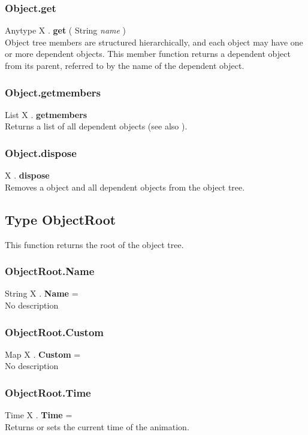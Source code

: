 \subsubsection{Object.get \label{F:Object:get}}
Anytype X . \textbf{get} ( String \textit{name} ) \\
Object tree members are structured hierarchically, and each object may have one or more dependent objects. This member function returns a dependent object from its parent, referred to by the name of the dependent object.

\subsubsection{Object.getmembers \label{F:Object:getmembers}}
List X . \textbf{getmembers} \\
Returns a list of all dependent objects (see also ).

\subsubsection{Object.dispose \label{F:Object:dispose}}
X . \textbf{dispose} \\
Removes a object and all dependent objects from the object tree.

\subsection{Type ObjectRoot \label{T:ObjectRoot}}
This function returns the root of the object tree.

\subsubsection{ObjectRoot.Name \label{F:ObjectRoot:Name}}
String X . \textbf{Name} = \\
No description

\subsubsection{ObjectRoot.Custom \label{F:ObjectRoot:Custom}}
Map X . \textbf{Custom} = \\
No description

\subsubsection{ObjectRoot.Time \label{F:ObjectRoot:Time}}
Time X . \textbf{Time} = \\
Returns or sets the current time of the animation.

